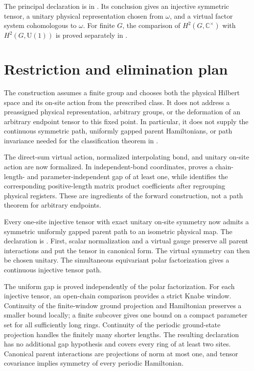 \documentclass[11pt]{article}
\begin{document}
The principal declaration is
 in
. Its conclusion gives an
injective symmetric tensor, a unitary physical representation chosen from
$\omega$, and a virtual factor system cohomologous to $\omega$. For finite
$G$, the comparison of $H^2(G,\mathbb C^\times)$ with
$H^2(G,\mathrm U(1))$ is proved separately in
.

\section{Restriction and elimination plan}

The construction assumes a finite group and chooses both the physical Hilbert
space and its on-site action from the prescribed class. It does not address a
preassigned physical representation, arbitrary groups, or the deformation of
an arbitrary endpoint tensor to this fixed point. In particular, it does not
supply the continuous symmetric path, uniformly gapped parent Hamiltonians,
or path invariance needed for the classification theorem in
.

The direct-sum virtual action, normalized interpolating bond, and unitary
on-site action are now formalized.  In independent-bond coordinates,
 proves a
chain-length- and parameter-independent gap of at least one, while
identifies the corresponding positive-length matrix product coefficients
after regrouping physical registers.  These are ingredients of the forward
construction, not a path theorem for arbitrary endpoints.

Every one-site injective tensor with exact unitary on-site symmetry now
admits a symmetric uniformly gapped parent path to an isometric physical
map. The declaration is
.
First, scalar normalization and a virtual gauge preserve all parent
interactions and put the tensor in canonical form. The virtual symmetry
can then be chosen unitary. The simultaneous equivariant polar
factorization gives a continuous injective tensor path.

The uniform gap is proved independently of the polar factorization.
For each injective tensor, an open-chain comparison provides a strict
Knabe window. Continuity of the finite-window ground projection and
Hamiltonian preserves a smaller bound locally; a finite subcover gives
one bound on a compact parameter set for all sufficiently long rings.
Continuity of the periodic ground-state projection handles the finitely
many shorter lengths. The resulting declaration
has no additional gap hypothesis and covers every ring of at least two
sites. Canonical parent interactions are projections of norm at most one,
and tensor covariance implies symmetry of every periodic Hamiltonian.
\end{document}
